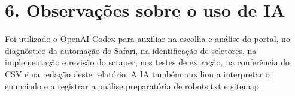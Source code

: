 \documentclass[10pt,a4paper]{article}
\begin{document}
\section*{6. Observações sobre o uso de IA}

Foi utilizado o OpenAI Codex para auxiliar na escolha e análise do portal, no diagnóstico da automação do Safari, na identificação de seletores, na implementação e revisão do scraper, nos testes de extração, na conferência do CSV e na redação deste relatório. A IA também auxiliou a interpretar o enunciado e a registrar a análise preparatória de robots.txt e sitemap.
\end{document}
